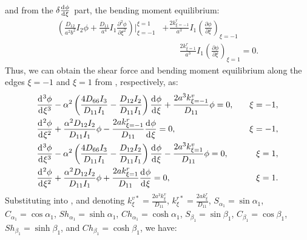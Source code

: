 \documentclass[preprint,12pt]{elsarticle}
\newcommand{\id}{\mathrm{d}\mkern1mu}
\begin{document}
%
and from the $\delta \frac{\id \phi}{\id \xi}$ part, the bending moment equilibrium:
%
\begin{equation}\label{eq:inertial_forcex2}
	\begin{split}	
		\left( \frac{D_{12}}{a^2b^2} I_2 \phi + \frac{D_{11}}{a^4} I_1 \frac{\partial^2 \phi}{\partial \xi^2} \right) 
		\Big|^{\xi=1}_{\xi=-1} 
		&+ \frac{2k^r_{\xi=-1}}{a^3} I_1 \left(\frac{\partial \phi}{\partial \xi}\right)_{\xi=-1} \\
		& \qquad\frac{2k^r_{\xi=1}}{a^3} I_1 \left(\frac{\partial \phi}{\partial \xi}\right)_{\xi=1} = 0.
	\end{split}
\end{equation}
%
Thus, we can obtain the shear force and bending moment equilibrium along the edges $\xi = -1$ and $\xi = 1$ from , respectively, as:
%
\begin{subequations}\label{eq:boundaryx}
	\begin{align}
		&  \frac{\id^3 \phi}{\id \xi^3} - \alpha^2\left( \frac{4D_{66}I_3}{D_{11}I_1}  - \frac{D_{12}I_2}{D_{11}I_1}  \right) \frac{\id \phi}{\id \xi} 
		+\frac{2a^3k^v_{\xi=-1}}{D_{11}}\phi = 0, \quad &\xi = -1, \\
		& \frac{\id^2 \phi}{\id \xi^2} + \frac{\alpha^2 D_{12} I_2}{D_{11} I_1} \phi - \frac{2a k^r_{\xi=-1}}{D_{11}} \frac{\id \phi}{\id \xi} = 0, \quad &\xi = -1, \\
		& \frac{\id^3 \phi}{\id \xi^3} - \alpha^2\left( \frac{4D_{66}I_3}{D_{11}I_1}  - \frac{D_{12}I_2}{D_{11}I_1}  \right) \frac{\id \phi}{\id \xi} 
		-\frac{2a^3 k^v_{\xi=1}}{D_{11}} \phi = 0, \quad &\xi = 1, \\
		& \frac{\id^2 \phi}{\id \xi^2} + \frac{\alpha^2 D_{12} I_2}{D_{11} I_1} \phi + \frac{2a k^r_{\xi=1}}{D_{11}} \frac{\id \phi}{\id \xi} = 0, \quad &\xi = 1.
	\end{align}
\end{subequations}
%
Substituting  into , and denoting $ k^{v*}_{\xi} = \frac{2a^3 k^v_{\xi}}{D_{11}} $, $ k^{r*}_{\xi} = \frac{2a k^r_{\xi}}{D_{11}} $, $ S_{\alpha_1}=\sin\alpha_1 $, $ C_{\alpha_1}=\cos\alpha_1 $, $ Sh_{\alpha_1}=\sinh\alpha_1 $, $ Ch_{\alpha_1}=\cosh\alpha_1 $, $S_{\beta_1}= \sin\beta_1 $, $C_{\beta_1}=\cos\beta_1$, $Sh_{\beta_1}=\sinh\beta_1 $, and $  Ch_{\beta_1}=\cosh\beta_1 $, we have:
%
\end{document}
